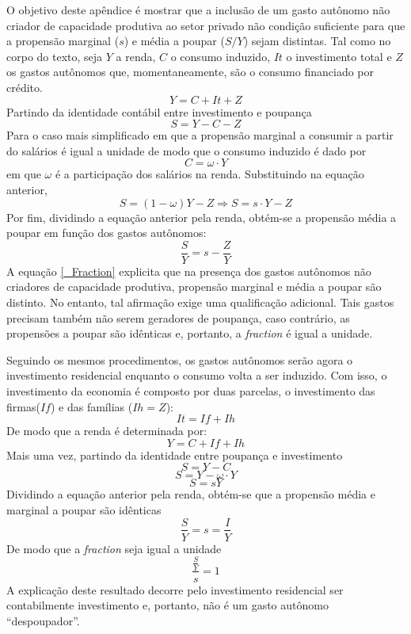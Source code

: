
O objetivo deste apêndice é mostrar que a inclusão de um gasto autônomo não criador de capacidade produtiva ao setor privado não condição suficiente para que a propensão marginal ($s$) e média a poupar ($S/Y$) sejam distintas. Tal como no corpo do texto, seja $Y$ a renda, $C$ o consumo induzido, $It$ o investimento total e $Z$ os gastos autônomos que, momentaneamente, são o consumo financiado por crédito. 
$$
Y = C + It + Z
$$
Partindo da identidade contábil entre investimento e poupança
$$
S = Y - C - Z
$$
Para o caso mais simplificado em que a propensão marginal a consumir a partir do salários é igual a unidade de modo que o consumo induzido é dado por
$$
C = \omega\cdot Y
$$
em que $\omega$ é a participação dos salários na renda. Substituindo na equação anterior,
$$
S = (1-\omega)Y - Z \Rightarrow S = s\cdot Y - Z
$$
Por fim, dividindo a equação anterior pela renda, obtém-se a propensão média a poupar em função dos gastos autônomos:
\begin{equation}
\label{_Fraction}
    \frac{S}{Y} = s - \frac{Z}{Y}
\end{equation}
A equação \ref{_Fraction} explicita que na presença dos gastos autônomos não criadores de capacidade produtiva, propensão marginal e média a poupar são distinto. No entanto, tal afirmação exige uma qualificação adicional. Tais gastos precisam também não serem geradores de poupança, caso contrário, as propensões a poupar são idênticas e, portanto, a \textit{fraction} é igual a unidade.

Seguindo os mesmos procedimentos, os gastos autônomos serão agora o investimento residencial enquanto o consumo volta a ser induzido. Com isso, o investimento da economia é composto por duas parcelas, o investimento das firmas($If$) e das famílias ($Ih = Z$):
$$
It = If + Ih
$$
De modo que a renda é determinada por:
$$
Y = C + If + Ih
$$
Mais uma vez, partindo da identidade entre poupança e investimento
$$
S = Y - C
$$
$$
S = Y - \omega\cdot Y
$$
$$
S = sY
$$
Dividindo a equação anterior pela renda, obtém-se que a propensão média e marginal a poupar são idênticas
$$
\frac{S}{Y} = s = \frac{I}{Y}
$$
De modo que a \textit{fraction} seja igual a unidade
$$
\frac{\frac{S}{Y}}{s} = 1
$$
A explicação deste resultado decorre pelo investimento residencial ser contabilmente investimento e, portanto, não é um gasto autônomo ``despoupador''. 

